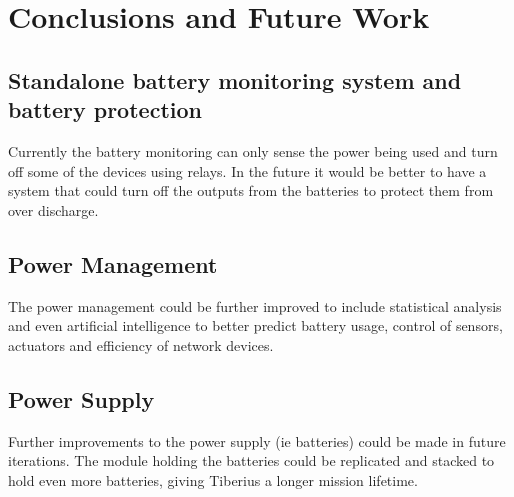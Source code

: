 \section{Conclusions and Future Work}
\subsection{Standalone battery monitoring system and battery protection}
Currently the battery monitoring can only sense the power being used and turn off some of the devices using relays. In the future it would be better to have a system that could turn off the outputs from the batteries to protect them from over discharge.
\subsection{Power Management} The power management could be further improved to include statistical analysis and even artificial intelligence to better predict battery usage, control of sensors, actuators and efficiency of network devices.
\subsection{Power Supply}
Further improvements to the power supply (ie batteries) could be made in future iterations.  The module holding the batteries could be replicated and stacked to hold even more batteries, giving Tiberius a longer mission lifetime.